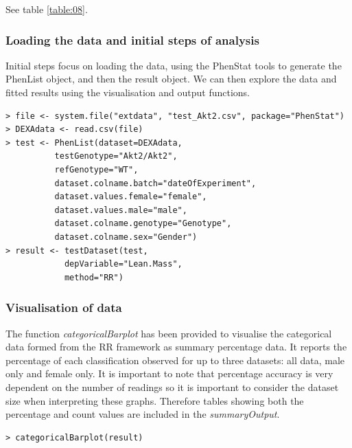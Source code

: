 \documentclass[12pt,a4paper]{article}
\begin{document}
See table \ref{table:08}.

\subsubsection{Loading the data and initial steps of analysis}
Initial steps focus on loading the data, using the PhenStat tools to generate the PhenList object, and then the result object. We can then explore the data and fitted results using the visualisation and output functions.


\begingroup
    \fontsize{8pt}{12pt}\selectfont
\begin{verbatim}
> file <- system.file("extdata", "test_Akt2.csv", package="PhenStat") 
> DEXAdata <- read.csv(file)
> test <- PhenList(dataset=DEXAdata,
		  testGenotype="Akt2/Akt2",
		  refGenotype="WT",
		  dataset.colname.batch="dateOfExperiment",
		  dataset.values.female="female",
		  dataset.values.male="male", 
		  dataset.colname.genotype="Genotype", 
		  dataset.colname.sex="Gender")
> result <- testDataset(test, 
			depVariable="Lean.Mass", 
			method="RR")
\end{verbatim}
\endgroup 

\subsubsection{Visualisation of data}
The function \textit{categoricalBarplot} has been provided to visualise the categorical data formed from the RR framework as summary percentage data. It reports the percentage of each classification observed for up to three datasets: all data, male only and female only. It is important to note that percentage accuracy is very dependent on the number of readings so it is important to consider the dataset size when interpreting these graphs. Therefore tables showing both the percentage and count values are included in the \textit{summaryOutput}.


\begingroup
    \fontsize{8pt}{12pt}\selectfont
\begin{verbatim}
> categoricalBarplot(result)
\end{verbatim}
\endgroup 
\end{document}
